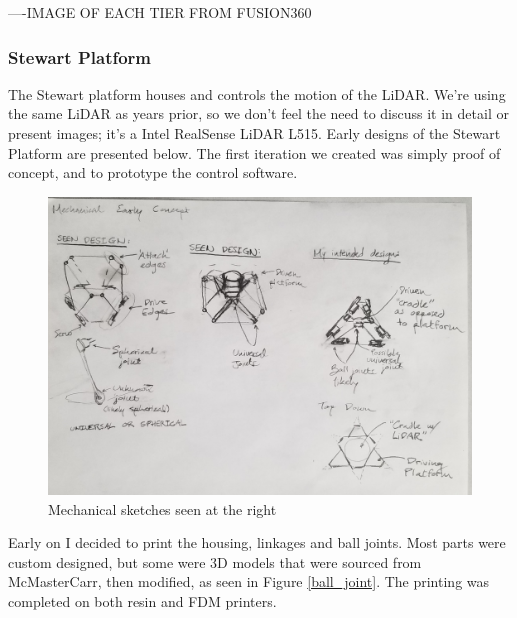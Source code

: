 \documentclass[a4paper, 10pt]{article}
\begin{document}
		----IMAGE OF EACH TIER FROM FUSION360
 		
 		\subsubsection*{Stewart Platform}
 		The Stewart platform houses and controls the motion of the LiDAR. We're using the same LiDAR as years prior, so we don't feel the need to discuss it in detail or present images; it's a Intel RealSense LiDAR L515. Early designs of the Stewart Platform are presented below. The first iteration we created was simply proof of concept, and to prototype the control software.
 		
 		\begin{figure} [h]
			\centering
			\includegraphics[scale=0.2]{Photos/early_mechanical}
			\caption{Mechanical sketches seen at the right}
			\label{basic_mechanical}
		\end{figure}
		
		Early on I decided to print the housing, linkages and ball joints. Most parts were custom designed, but some were 3D models that were sourced from McMasterCarr, then modified, as seen in Figure \ref{ball_joint}. The printing was completed on both resin and FDM printers.
		
\end{document}
